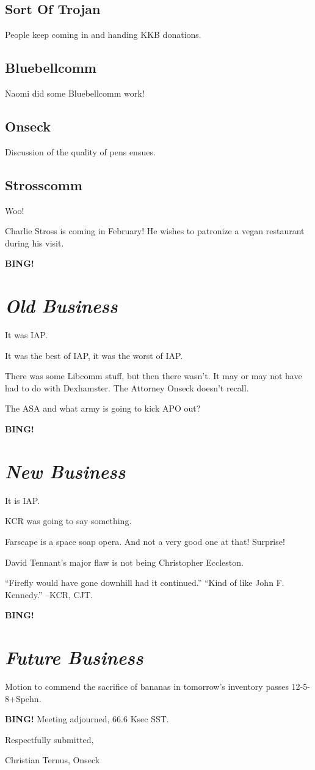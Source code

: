 \documentclass[10pt]{article}
\newcommand{\bing}{{\bf BING!} }
\newcommand{\goto}[1]{\bing \vskip 12pt \section*{{\em{#1}}}}
\begin{document}
\subsection*{Sort Of Trojan}

People keep coming in and handing KKB donations.  

\subsection*{Bluebellcomm}

Naomi did some Bluebellcomm work!

\subsection*{Onseck}

Discussion of the quality of pens ensues.

\subsection*{Strosscomm}

Woo!

Charlie Stross is coming in February!  He wishes to patronize a vegan
restaurant during his visit.

\goto{Old Business}

It was IAP.

It was the best of IAP, it was the worst of IAP.

There was some Libcomm stuff, but then there wasn't.  It may or may
not have had to do with Dexhamster.  The Attorney Onseck doesn't
recall.

The ASA and what army is going to kick APO out?

\goto{New Business}

It is IAP.

KCR was going to say something.

Farscape is a space soap opera.  And not a very good one at that!  Surprise!

David Tennant's major flaw is not being Christopher Eccleston.

``Firefly would have gone downhill had it continued.'' ``Kind of like John F. Kennedy.'' --KCR, CJT. 

\goto{Future Business}

Motion to commend the sacrifice of bananas in tomorrow's inventory passes 12-5-8+Spehn.

\bing
\noindent
Meeting adjourned, 66.6 Ksec SST.

\vspace{18pt}

\centerline{Respectfully submitted,}
\centerline{Christian Ternus, Onseck}
\end{document}
